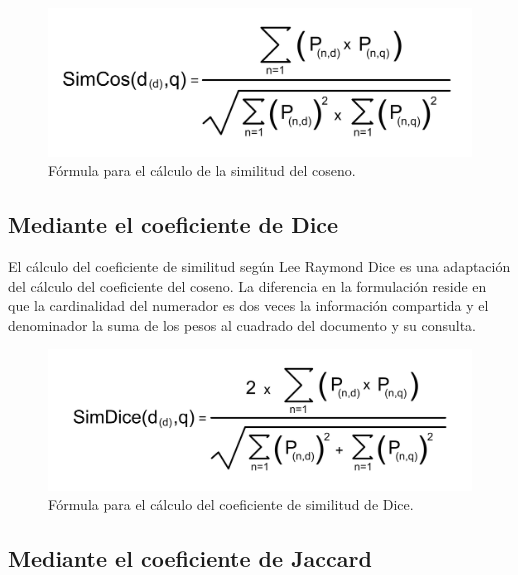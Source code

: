 \documentclass[titlepage]{article}
\begin{document}
\begin{figure}[h]
	\begin{center}
		\includegraphics*[scale=0.5]{similitud_coseno_formula.png}
	\end{center}
	\caption{Fórmula para el cálculo de la similitud del coseno.}
	\label{fig: Figure 3}
\end{figure}

\subsection{Mediante el coeficiente de Dice}

El cálculo del coeficiente de similitud según Lee Raymond Dice\cite{dice} es una adaptación del cálculo del coeficiente del coseno. La diferencia en la formulación reside en que la cardinalidad del numerador es dos veces la información compartida y el denominador la suma de los pesos al cuadrado del documento y su consulta. 

\begin{figure}[h]
	\begin{center}
		\includegraphics*[scale=0.5]{similitud_dice.png}
	\end{center}
	\caption{Fórmula para el cálculo del coeficiente de similitud de Dice.}
	\label{fig: Figure 4}
\end{figure}

\subsection{Mediante el coeficiente de Jaccard}
\end{document}
